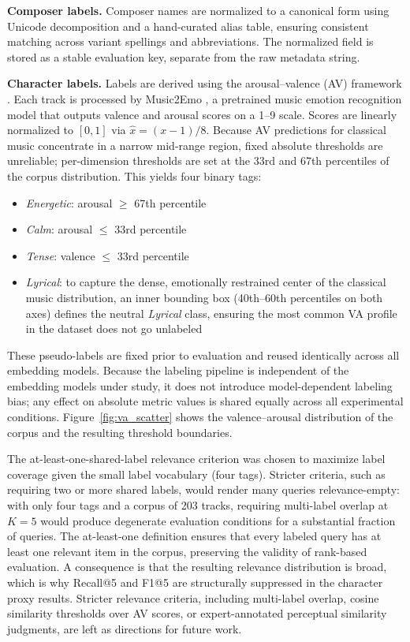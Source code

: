 \documentclass{CPP}
\begin{document}
\textbf{Composer labels.} Composer names are normalized to a canonical form using Unicode decomposition and a hand-curated alias table, ensuring consistent matching across variant spellings and abbreviations. The normalized field is stored as a stable evaluation key, separate from the raw metadata string.

\textbf{Character labels.} Labels are derived using the arousal--valence (AV) framework \cite{eerola2011}. Each track is processed by Music2Emo \cite{music2emo2025}, a pretrained music emotion recognition model that outputs valence and arousal scores on a 1--9 scale. Scores are linearly normalized to $[0,1]$ via $\hat{x} = (x-1)/8$. Because AV predictions for classical music concentrate in a narrow mid-range region, fixed absolute thresholds are unreliable; per-dimension thresholds are set at the 33rd and 67th percentiles of the corpus distribution. This yields four binary tags:
\begin{itemize}
  \item \textit{Energetic}: arousal $\geq$ 67th percentile
  \item \textit{Calm}: arousal $\leq$ 33rd percentile
  \item \textit{Tense}: valence $\leq$ 33rd percentile
  \item \textit{Lyrical}: to capture the dense, emotionally restrained center of the classical music distribution, an inner bounding box (40th--60th percentiles on both axes) defines the neutral \textit{Lyrical} class, ensuring the most common VA profile in the dataset does not go unlabeled
\end{itemize}

These pseudo-labels are fixed prior to evaluation and reused identically across all embedding models. Because the labeling pipeline is independent of the embedding models under study, it does not introduce model-dependent labeling bias; any effect on absolute metric values is shared equally across all experimental conditions. Figure~\ref{fig:va_scatter} shows the valence--arousal distribution of the corpus and the resulting threshold boundaries.

The at-least-one-shared-label relevance criterion was chosen to maximize label coverage given the small label vocabulary (four tags). Stricter criteria, such as requiring two or more shared labels, would render many queries relevance-empty: with only four tags and a corpus of 203 tracks, requiring multi-label overlap at $K{=}5$ would produce degenerate evaluation conditions for a substantial fraction of queries. The at-least-one definition ensures that every labeled query has at least one relevant item in the corpus, preserving the validity of rank-based evaluation. A consequence is that the resulting relevance distribution is broad, which is why Recall@5 and F1@5 are structurally suppressed in the character proxy results. Stricter relevance criteria, including multi-label overlap, cosine similarity thresholds over AV scores, or expert-annotated perceptual similarity judgments, are left as directions for future work.
\end{document}
